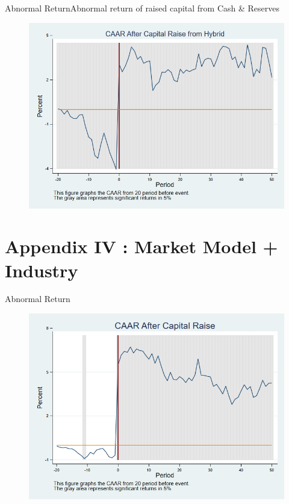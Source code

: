 \documentclass{beamer}
\begin{document}
\begin{frame}{Abnormal Return}{Abnormal return of raised capital from Cash \& Reserves}
	\label{car_marketmodelHybrid}
	\begin{figure}
		\centering
		\includegraphics[width=0.65\linewidth]{Output/car_marketmodelHybrid.png}
		\label{fig:car_marketmodelHybrid}
	\end{figure}
\end{frame}


\section{Appendix IV : Market Model + Industry }


\begin{frame}{Abnormal Return}
	\label{car_marketmodel_industry}
	\begin{figure}
		\centering
		\includegraphics[width=0.7\linewidth]{Output/car_marketmodel_industry.png}
		\label{fig:car_marketmodel_industry}
	\end{figure}
\end{frame}
\end{document}
